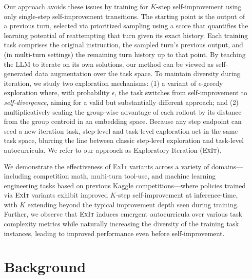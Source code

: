 \documentclass[10pt]{article} %
\newcommand{\methodname}{\textsc{ExIt}}
\begin{document}
Our approach avoids these issues by training for $K$-step self-improvement using only single-step self-improvement transitions. The starting point is the output of a previous turn, selected via prioritized sampling using a score that quantifies the learning potential of reattempting that turn given its exact history. Each training task comprises the original instruction, the sampled turn's previous output, and (in multi-turn settings) the remaining turn history up to that point. By teaching the LLM to iterate on its own solutions, our method can be viewed as self-generated data augmentation over the task space. To maintain diversity during iteration, we study two exploration mechanisms: (1) a variant of $\epsilon$-greedy exploration where, with probability $\epsilon$, the task switches from self-improvement to \emph{self-divergence}, aiming for a valid but substantially different approach; and (2) multiplicatively scaling the group-wise advantage of each rollout by its distance from the group centroid in an embedding space. Because any step endpoint can seed a new iteration task, step-level and task-level exploration act in the same task space, blurring the line between classic step-level exploration and task-level autocurricula. We refer to our approach as Exploratory Iteration (\methodname{}). 

We demonstrate the effectiveness of \methodname{} variants across a variety of domains—including competition math, multi-turn tool-use, and machine learning engineering tasks based on previous Kaggle competitions—where policies trained via \methodname{} variants exhibit improved $K$-step self-improvement at inference-time, with $K$ extending beyond the typical improvement depth seen during training. Further, we observe that \methodname{} induces emergent autocurricula over various task complexity metrics while naturally increasing the  diversity of the training task instances, leading to improved performance even before self-improvement.


















\section{Background}
\end{document}
